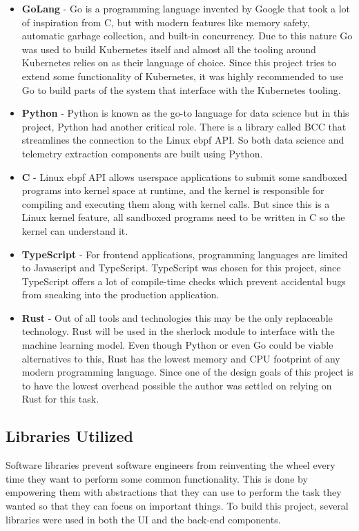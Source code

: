 \begin{itemize}[noitemsep,nolistsep] 
    \item \textbf{GoLang} - Go is a programming language invented by Google that took a lot of inspiration from C, but with modern features like memory safety, automatic garbage collection, and built-in concurrency. Due to this nature Go was used to build Kubernetes itself and almost all the tooling around Kubernetes relies on as their language of choice. Since this project tries to extend some functionality of Kubernetes, it was highly recommended to use Go to build parts of the system that interface with the Kubernetes tooling.
    \item \textbf{Python} - Python is known as the go-to language for data science but in this project, Python had another critical role. There is a library called BCC that streamlines the connection to the Linux \ac{ebpf} API. So both data science and telemetry extraction components are built using Python.
    \item \textbf{C} - Linux \ac{ebpf} API allows userspace applications to submit some sandboxed programs into kernel space at runtime, and the kernel is responsible for compiling and executing them along with kernel calls. But since this is a Linux kernel feature, all sandboxed programs need to be written in C so the kernel can understand it.
    \item \textbf{TypeScript} - For frontend applications, programming languages are limited to Javascript and TypeScript. TypeScript was chosen for this project, since TypeScript offers a lot of compile-time checks which prevent accidental bugs from sneaking into the production application.
    \item \textbf{Rust} - Out of all tools and technologies this may be the only replaceable technology. Rust will be used in the \ac{sherlock} module to interface with the machine learning model. Even though Python or even Go could be viable alternatives to this, Rust has the lowest memory and CPU footprint of any modern programming language. Since one of the design goals of this project is to have the lowest overhead possible the author was settled on relying on Rust for this task.
\end{itemize}



\subsection{Libraries Utilized}
Software libraries prevent software engineers from reinventing the wheel every time they want to perform some common functionality. This is done by empowering them with abstractions that they can use to perform the task they wanted so that they can focus on important things. To build this project, several libraries were used in both the UI and the back-end components.


